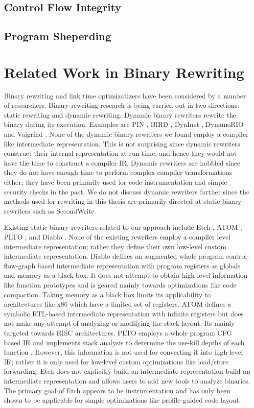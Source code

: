 \subsection{Control Flow Integrity}

\subsection{Program Sheperding}

\section{Related Work in Binary Rewriting}

Binary rewriting and link time optimizatizers have been considered by a number of researchers.
Binary rewriting research is being carried out in two directions: static rewriting and dynamic
rewriting. Dynamic binary rewriters rewrite the binary during its execution. Examples are PIN
\cite{pin}, BIRD \cite{bird}, DynInst \cite{dyninst}, DynamoRIO \cite{drio} and Valgrind \cite{valg}. None of the dynamic
binary rewriters we found employ a compiler like intermediate representation. This is not surprising
since dynamic rewriters construct their internal representation at run-time, and hence they would
not have the time to construct a compiler IR. Dynamic rewriters are hobbled since they do not have
enough time to perform complex compiler transformations either; they have been primarily used for
code instrumentation and simple security checks in the past. We do not discuss dynamic rewriters
further since the methods used for rewriting in this thesis are primarily directed at static binary
rewriters such as SecondWrite.

Existing static binary rewriters related to our approach include Etch \cite{etch}, ATOM \cite{atom}, PLTO
\cite{plto}, and Diablo \cite{Diablo1}. None of the existing rewriters employ a compiler level intermediate
representation; rather they define their own low-level custom intermediate representation. Diablo
defines an augmented whole program control-flow-graph based intermediate representation with program
registers as globals and memory as a black box. It does not attempt to obtain high-level information
like function prototypes and is geared mainly towards optimizations like code compaction. Taking
memory as a black box limits its applicability to architectures like x86 which have a limited set of
registers. ATOM defines a symbolic RTL-based intermediate representation with infinite registers but
does not make any attempt of analyzing or modifying the stack layout. Its mainly targeted towards
RISC architectures. PLTO employs a whole program CFG based IR and implements stack analysis to
determine the use-kill depths of each function \cite{}. However, this information is not used for
converting it into high-level IR; rather it is only used for low-level custom optimizations like
load/store forwarding. Etch does not explicitly build an intermediate representation build an
intermediate representation and allows users to add new tools to analyze binaries. The primary goal
of Etch appears to be instrumentation and has only been shown to be applicable for simple
optimizations like profile-guided code layout.

